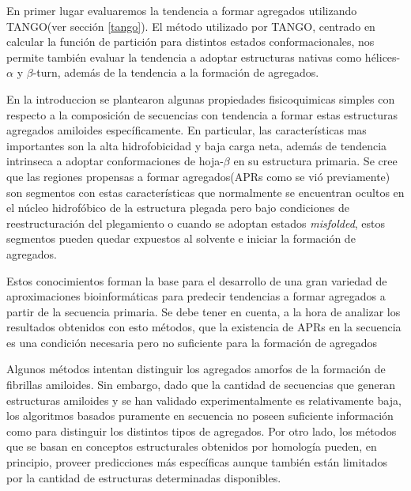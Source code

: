En primer lugar evaluaremos la tendencia a formar agregados utilizando TANGO(ver sección \ref{tango}). 
El método utilizado por TANGO, centrado en calcular la función de partición para distintos estados conformacionales, nos permite también evaluar la tendencia a adoptar estructuras nativas como hélices-$\alpha$ y $\beta$-turn,
además de la tendencia a la formación de agregados. 



En la introduccion se plantearon algunas propiedades fisicoquimicas simples con respecto a la composición de secuencias con tendencia a formar estas estructuras agregados amiloides específicamente.
En particular, las características mas importantes son la alta hidrofobicidad y baja carga neta, además de tendencia intrinseca a adoptar conformaciones de hoja-$\beta$ en su estructura primaria.
Se cree que las regiones propensas a formar agregados(APRs como se vió previamente) son segmentos con estas características que normalmente se encuentran ocultos en el núcleo hidrofóbico de la estructura plegada pero
bajo condiciones de reestructuración del plegamiento o cuando se adoptan estados \textit{misfolded}, estos segmentos pueden quedar expuestos al solvente e iniciar la formación de agregados.

Estos conocimientos forman la base para el desarrollo de una gran variedad de aproximaciones bioinformáticas para predecir tendencias a formar agregados a partir de la secuencia primaria.
Se debe tener en cuenta, a la hora de analizar los resultados obtenidos con esto métodos, que la existencia de APRs en la secuencia es una condición necesaria pero no suficiente para la formación de agregados


Algunos métodos intentan distinguir los agregados amorfos de la formación de fibrillas amiloides. 
Sin embargo, dado que la cantidad de secuencias que generan estructuras amiloides y se han validado experimentalmente es relativamente baja, los algoritmos basados puramente en secuencia no poseen 
suficiente información como para distinguir los distintos tipos de agregados.
Por otro lado, los métodos que se basan en conceptos estructurales obtenidos por homología pueden, en principio, proveer predicciones más específicas aunque también están limitados por la cantidad de estructuras determinadas disponibles.

